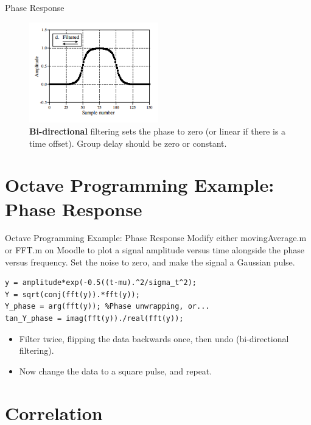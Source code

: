 \documentclass{beamer}
\begin{document}
\begin{frame}{Phase Response}
\small
\begin{figure}
\centering
\includegraphics[width=0.5\textwidth]{figures/phase4.png}
\caption{\label{fig:phase4} \textbf{Bi-directional} filtering sets the phase to zero (or linear if there is a time offset).  Group delay should be zero or constant.}
\end{figure}
\end{frame}

\section{Octave Programming Example: Phase Response}

\begin{frame}[fragile]{Octave Programming Example: Phase Response}
Modify either movingAverage.m or FFT.m on Moodle to plot a signal amplitude versus time alongside the phase versus frequency.  Set the noise to zero, and make the signal a Gaussian pulse.
\begin{verbatim}
y = amplitude*exp(-0.5((t-mu).^2/sigma_t^2);
Y = sqrt(conj(fft(y)).*fft(y));
Y_phase = arg(fft(y)); %Phase unwrapping, or...
tan_Y_phase = imag(fft(y))./real(fft(y));
\end{verbatim}
\begin{itemize}
\item Filter twice, flipping the data backwards once, then undo (bi-directional filtering).
\item Now change the data to a square pulse, and repeat.
\end{itemize}
\end{frame}

\section{Correlation}
\end{document}
